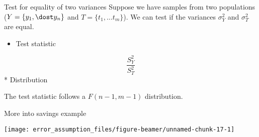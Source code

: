 \begin{frame}{Test for equality of two variances}
\protect\hypertarget{test-for-equality-of-two-variances}{}
Suppose we have samples from two populations (\(Y = \{y_1,\dost y_n\}\)
and \(T = \{t_1, \dots t_m\}\)). We can test if the variances
\(\sigma_Y^2\) and \(\sigma_T^2\) are equal.

\begin{itemize}
\tightlist
\item
  Test statistic
\end{itemize}

\[\frac{S_Y^2}{S_T^2}\] * Distribution

The test statistic follows a \(F(n-1,m-1)\) distribution.
\end{frame}

\begin{frame}[fragile]{More into savings example}
\protect\hypertarget{more-into-savings-example}{}
\begin{Shaded}
\begin{Highlighting}[]
\NormalTok{(} \NormalTok{(}\NormalTok{,}\NormalTok{))}
\OperatorTok{$}
\NormalTok{=}\NormalTok{)}
\NormalTok{(}\NormalTok{)}
\OperatorTok{$}\NormalTok{,}\NormalTok{)}
\NormalTok{(}\NormalTok{)}
\end{Highlighting}
\end{Shaded}

\begin{center}\texttt{[image: error\_assumption\_files/figure-beamer/unnamed-chunk-17-1]} \end{center}
\end{frame}

